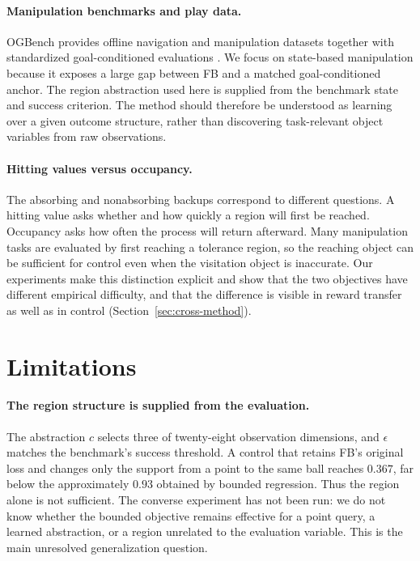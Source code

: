 \documentclass{article}
\newcommand{\cube}{c}
\begin{document}
\paragraph{Manipulation benchmarks and play data.}
OGBench provides offline navigation and manipulation datasets together with
standardized goal-conditioned evaluations \citep{park2024ogbench}. We focus on
state-based manipulation because it exposes a large gap between FB and a matched
goal-conditioned anchor. The region abstraction used here is supplied from the
benchmark state and success criterion. The method should therefore be understood
as learning over a given outcome structure, rather than discovering task-relevant
object variables from raw observations.

\paragraph{Hitting values versus occupancy.}
The absorbing and nonabsorbing backups correspond to different questions. A
hitting value asks whether and how quickly a region will first be reached.
Occupancy asks how often the process will return afterward. Many manipulation
tasks are evaluated by first reaching a tolerance region, so the reaching object
can be sufficient for control even when the visitation object is inaccurate. Our
experiments make this distinction explicit and show that the two objectives have
different empirical difficulty, and that the difference is visible in reward
transfer as well as in control (Section~\ref{sec:cross-method}).

\section{Limitations}
\label{sec:limitations}

\paragraph{The region structure is supplied from the evaluation.}
The abstraction $\cube$ selects three of twenty-eight observation dimensions, and
$\epsilon$ matches the benchmark's success threshold. A control that retains FB's
original loss and changes only the support from a point to the same ball reaches
$0.367$, far below the approximately $0.93$ obtained by bounded regression. Thus
the region alone is not sufficient. The converse experiment has not been run: we
do not know whether the bounded objective remains effective for a point query, a
learned abstraction, or a region unrelated to the evaluation variable. This is
the main unresolved generalization question.
\end{document}
